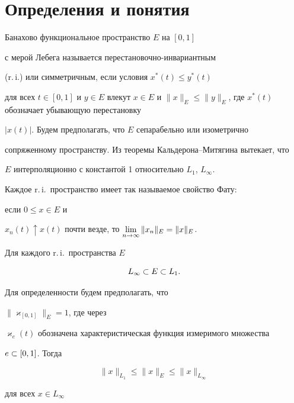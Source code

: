\section{Определения и понятия}





Банахово функциональное пространство $E$ на $[0,1]$ 


с мерой Лебега называется пе\-ре\-ста\-но\-воч\-но-инвариантным


(r.\,i.) или симметричным, если условия $x^* (t) \le y^*(t)$ 


для всех $t\in [0,1]$ и $y\in E$ влекут $x\in E$ и $\|x\|_E \le 


\|y\|_E$, где $x^* (t)$ обозначает убывающую перестановку


$|x(t)|$. Будем предполагать, что $E$ сепарабельно или изометрично 


сопряженному пространству. Из теоремы Кальдерона--Митягина вытекает, что 


$E$ интерполяционно с константой 1 относительно $L_1$, $L_\infty$. 


Каждое r.\,i.\ пространство имеет так называемое свойство Фату:


если $0 \le x\in E$ и


$x_n (t) \uparrow x(t)$ почти везде, то $\liml{n \to \infty} 


\|x_n\|_E = \|x\|_E$.





Для каждого r.\,i.\ пространства $E$ 


\begin{equation}\label{e3}


L_\infty \sus E \sus L_1.


\end{equation}


Для определенности будем предполагать, что 


$\|\varkappa_{[0,1]} \|_E =1$, где через


$\varkappa_e(t)$ обозначена характеристическая функция измеримого множества 


$e\subset [0,1]$. Тогда


\begin{equation}\label{e4}


\|x\|_{L_1} \le \|x\|_E \le \|x\|_{L_\infty}


\end{equation}


для всех $x\in L_\infty$ 


